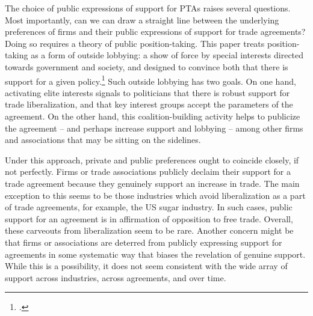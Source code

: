 \documentclass[hidelinks,12pt,letter]{article}
\begin{document}

The choice of public expressions of support for PTAs raises several questions. Most importantly, can we can draw a straight line between the underlying preferences of firms and their public expressions of support for trade agreements? Doing so requires a theory of public position-taking. This paper treats position-taking as a form of outside lobbying: a show of force by special interests directed towards government and society, and designed to convince both that there is support for a given policy.\footnote{\citealt{kollman1998outside}.} Such outside lobbying has two goals. On one hand, activating elite interests signals to politicians that there is robust support for trade liberalization, and that key interest groups accept the parameters of the agreement. On the other hand, this coalition-building activity helps to publicize the agreement -- and perhaps increase support and lobbying -- among other firms and associations that may be sitting on the sidelines. 

Under this approach, private and public preferences ought to coincide closely, if not perfectly. Firms or trade associations publicly declaim their support for a trade agreement because they genuinely support an increase in trade. The main exception to this seems to be those industries which avoid liberalization as a part of trade agreements, for example, the US sugar industry. In such cases, public support for an agreement is in affirmation of opposition to free trade. Overall, these carveouts from liberalization seem to be rare. Another concern might be that firms or associations are deterred from publicly expressing support for agreements in some systematic way that biases the revelation of genuine support. While this is a possibility, it does not seem consistent with the wide array of support across industries, across agreements, and over time.
\end{document}
